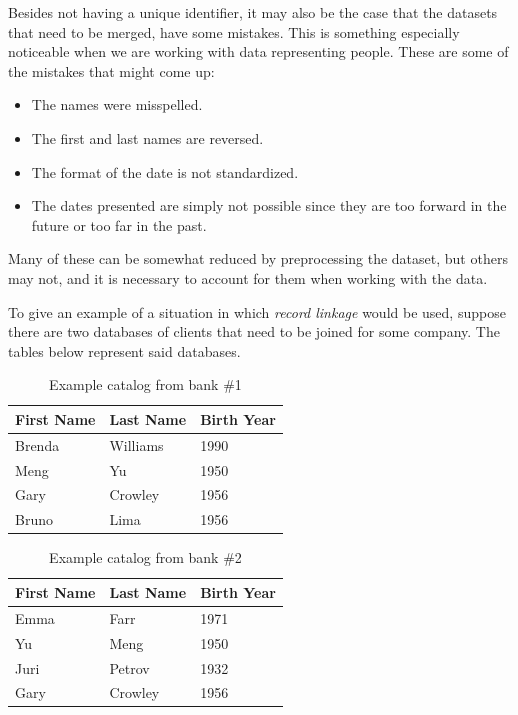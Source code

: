 \documentclass[epsfig,a4paper,11pt,titlepage,twoside,openany]{book}
\begin{document}
Besides not having a unique identifier, it may also be the case that the datasets that need to be merged, have some mistakes. This is something especially noticeable when we are working with data representing people. These are some of the mistakes that might come up: 

\begin{itemize}
\item The names were misspelled.
\item The first and last names are reversed.
\item The format of the date is not standardized.
\item The dates presented are simply not possible since they are too forward in the future or too far in the past.
\end{itemize}

Many of these can be somewhat reduced by preprocessing the dataset, but others may not, and it is necessary to account for them when working with the data.

To give an example of a situation in which \textit{record linkage} would be used,
suppose there are two databases of clients that need to be joined for some company. The tables below represent said databases.


\begin{table}[H]
  \centering{}
  \begin{tabular}{l|l|l}
    First Name & Last Name  & Birth Year \\ \hline
    Brenda     & Williams   & 1990       \\
    Meng        & Yu         & 1950       \\
    Gary        & Crowley   &  1956 \\
    Bruno      & Lima       & 1956      
  \end{tabular}
  \caption{Example catalog from bank \#1}
  \label{tab:ex-catalog-1}
\end{table}


\begin{table}[H]
  \centering{}
  \begin{tabular}{l|l|l}
    First Name & Last Name  & Birth Year \\ \hline
    Emma       & Farr       & 1971       \\
    Yu         & Meng       & 1950       \\
    Juri       &  Petrov    & 1932 \\
    Gary       & Crowley    & 1956      
  \end{tabular}
  \caption{Example catalog from bank \#2}
  \label{tab:ex-catalog-2}
\end{table}
\end{document}
